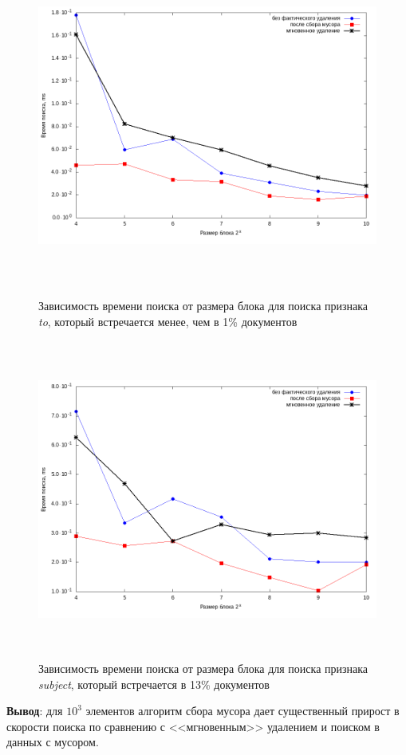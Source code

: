 \begin{figure}[H]
\includegraphics[width=\linewidth, height=10.5cm]{fig/limit_1e6/1e3/to.png}
\caption{Зависимость времени поиска от размера блока для поиска признака \textit{to}, который встречается менее, чем в 1\% документов}
\includegraphics[width=\linewidth, height=10.5cm]{fig/limit_1e6/1e3/subject.png}
\caption{Зависимость времени поиска от размера блока для поиска признака \textit{subject}, который встречается в 13\% документов}
\end{figure}

\textbf{Вывод}: для $10^3$ элементов алгоритм сбора мусора дает существенный
прирост в скорости поиска по сравнению с <<мгновенным>> удалением и поиском в данных с мусором.

